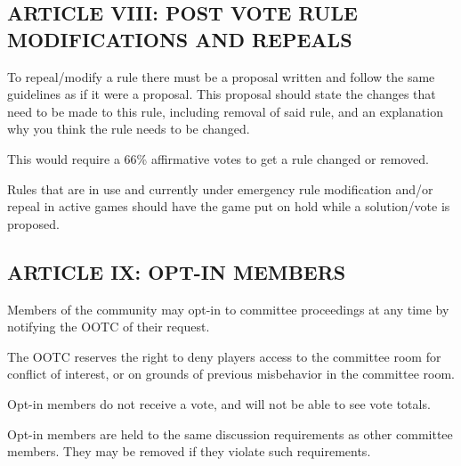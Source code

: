 \subsection{ARTICLE VIII: POST VOTE RULE MODIFICATIONS AND REPEALS}
\begin{deepEnumerate}
    \item To repeal/modify a rule there must be a proposal written and follow the same guidelines as if it were a proposal. 
    This proposal should state the changes that need to be made to this rule, including removal of said rule, and an explanation why you think the rule needs to be changed.
    \begin{deepEnumerate}
        \item This would require a 66\% affirmative votes to get a rule changed or removed.
        \item Rules that are in use and currently under emergency rule modification and/or repeal in active games should have the game put on hold 
        while a solution/vote is proposed.
    \end{deepEnumerate}
\end{deepEnumerate}

\subsection{ARTICLE IX: OPT-IN MEMBERS}
\begin{deepEnumerate}
    \item Members of the community may opt-in to committee proceedings at any time by notifying the OOTC of their request.
    \begin{deepEnumerate}
        \item The OOTC reserves the right to deny players access to the committee room for conflict of interest, or on grounds of previous misbehavior in the committee room.
        \item Opt-in members do not receive a vote, and will not be able to see vote totals.
        \item Opt-in members are held to the same discussion requirements as other committee members. They may be removed if they violate such requirements.
    \end{deepEnumerate}
\end{deepEnumerate}

